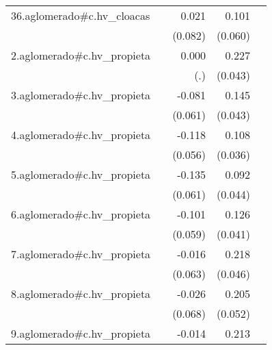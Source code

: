 {\begin{longtable}{l*{4}{D{.}{.}{-1}}}
\addlinespace
36.aglomerado#c.hv\_cloacas&                     &       0.021         &       0.101         &                     \\
            &                     &     (0.082)         &     (0.060)         &                     \\
\addlinespace
2.aglomerado#c.hv\_propieta&                     &       0.000         &       0.227\sym{***}&                     \\
            &                     &         (.)         &     (0.043)         &                     \\
\addlinespace
3.aglomerado#c.hv\_propieta&                     &      -0.081         &       0.145\sym{***}&                     \\
            &                     &     (0.061)         &     (0.043)         &                     \\
\addlinespace
4.aglomerado#c.hv\_propieta&                     &      -0.118\sym{*}  &       0.108\sym{**} &                     \\
            &                     &     (0.056)         &     (0.036)         &                     \\
\addlinespace
5.aglomerado#c.hv\_propieta&                     &      -0.135\sym{*}  &       0.092\sym{*}  &                     \\
            &                     &     (0.061)         &     (0.044)         &                     \\
\addlinespace
6.aglomerado#c.hv\_propieta&                     &      -0.101         &       0.126\sym{**} &                     \\
            &                     &     (0.059)         &     (0.041)         &                     \\
\addlinespace
7.aglomerado#c.hv\_propieta&                     &      -0.016         &       0.218\sym{***}&                     \\
            &                     &     (0.063)         &     (0.046)         &                     \\
\addlinespace
8.aglomerado#c.hv\_propieta&                     &      -0.026         &       0.205\sym{***}&                     \\
            &                     &     (0.068)         &     (0.052)         &                     \\
\addlinespace
9.aglomerado#c.hv\_propieta&                     &      -0.014         &       0.213\sym{***}&                     \\

\end{longtable}}
